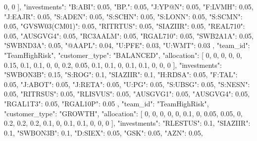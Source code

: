 {{                0,
                0
            ],
            "investments": {
                "B:ABI": 0.05,
                "BP.": 0.05,
                "J:YP@N": 0.05,
                "F:LVMH": 0.05,
                "J:EAJR": 0.05,
                "S:ADEN": 0.05,
                "S:SCHN": 0.05,
                "S:LONN": 0.05,
                "S:SCMN": 0.05,
                "GVSW03(CM01)": 0.05,
                "RITRTUS": 0.05,
                "SIAZIIR": 0.05,
                "REAL710": 0.05,
                "AUSGVG4": 0.05,
                "RC3AALM": 0.05,
                "RGAL710": 0.05,
                "SWB2A1A": 0.05,
                "SWBND3A": 0.05,
                "@AAPL": 0.04,
                "U:PFE": 0.03,
                "U:WMT": 0.03
            }
        },
        {
            "team_id": "TeamHighRisk",
            "customer_type": "BALANCED",
            "allocation": [
                0,
                0,
                0,
                0,
                0,
                0.15,
                0.1,
                0.1,
                0,
                0,
                0.2,
                0.05,
                0.1,
                0.1,
                0,
                0.1,
                0.1,
                0,
                0,
                0
            ],
            "investments": {
                "SWBON3B": 0.15,
                "S:ROG": 0.1,
                "SIAZIIR": 0.1,
                "H:RDSA": 0.05,
                "F:TAL": 0.05,
                "J:ABOT": 0.05,
                "J:RETA": 0.05,
                "U:PG": 0.05,
                "S:UBSG": 0.05,
                "S:NESN": 0.05,
                "RITRSUS": 0.05,
                "RLISVUS": 0.05,
                "AUSGVG1": 0.05,
                "AUSGVG4": 0.05,
                "RGAL1T3": 0.05,
                "RGAL10P": 0.05
            }
        },
        {
            "team_id": "TeamHighRisk",
            "customer_type": "GROWTH",
            "allocation": [
                0,
                0,
                0,
                0,
                0,
                0.1,
                0,
                0.05,
                0.05,
                0,
                0.2,
                0.2,
                0.2,
                0.1,
                0,
                0.1,
                0.1,
                0,
                0,
                0
            ],
            "investments": {
                "RLESTUS": 0.1,
                "SIAZIIR": 0.1,
                "SWBON3B": 0.1,
                "D:SIEX": 0.05,
                "GSK": 0.05,
                "AZN": 0.05,
}}}
